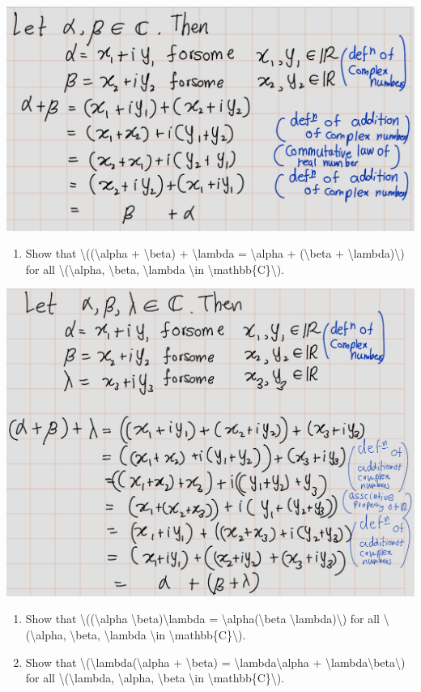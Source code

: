 \documentclass[
]{book}
\providecommand{\tightlist}{%
  \setlength{\itemsep}{0pt}\setlength{\parskip}{0pt}}
\theoremstyle{definition}
\theoremstyle{definition}
\theoremstyle{definition}
\theoremstyle{definition}
\theoremstyle{remark}
\begin{document}
\includegraphics{fig/Ex1A/Ex1.png}

\begin{enumerate}
\def\labelenumi{\arabic{enumi}.}
\setcounter{enumi}{1}
\tightlist
\item
  Show that \textbackslash((\textbackslash alpha + \textbackslash beta) + \textbackslash lambda = \textbackslash alpha + (\textbackslash beta + \textbackslash lambda)\textbackslash) for all \textbackslash(\textbackslash alpha, \textbackslash beta, \textbackslash lambda \textbackslash in \textbackslash mathbb\{C\}\textbackslash).
\end{enumerate}

\includegraphics{fig/Ex1A/Ex2.png}

\begin{enumerate}
\def\labelenumi{\arabic{enumi}.}
\setcounter{enumi}{2}
\item
  Show that \textbackslash((\textbackslash alpha \textbackslash beta)\textbackslash lambda = \textbackslash alpha(\textbackslash beta \textbackslash lambda)\textbackslash) for all \textbackslash(\textbackslash alpha, \textbackslash beta, \textbackslash lambda \textbackslash in \textbackslash mathbb\{C\}\textbackslash).
\item
  Show that \textbackslash(\textbackslash lambda(\textbackslash alpha + \textbackslash beta) = \textbackslash lambda\textbackslash alpha + \textbackslash lambda\textbackslash beta\textbackslash) for all \textbackslash(\textbackslash lambda, \textbackslash alpha, \textbackslash beta \textbackslash in \textbackslash mathbb\{C\}\textbackslash).
\end{enumerate}
\end{document}
